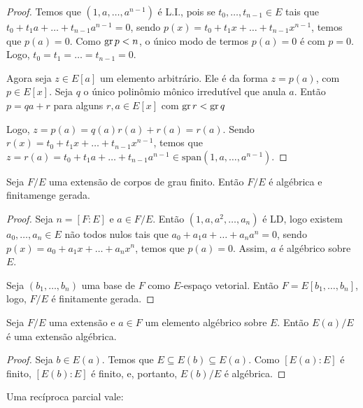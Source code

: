 \begin{proof}
    Temos que $(1, a, \dots, a^{n-1})$ é L.I., pois se $t_0, \dots, t_{n-1} \in E$ tais que $t_0+t_1a+\dots+t_{n-1}a^{n-1}=0$, sendo $p(x)=t_0+t_1x+\dots+t_{n-1}x^{n-1}$, temos que $p(a)=0$. Como $\operatorname{gr} p<n$, o único modo de termos $p(a)=0$ é com $p=0$. Logo, $t_0=t_1=\dots=t_{n-1}=0$.

    Agora seja $z \in E[a]$ um elemento arbitrário. Ele é da forma $z=p(a)$, com $p \in E[x]$. Seja $q$ o único polinômio mônico irredutível que anula $a$. Então $p=qa+r$ para alguns $r, a \in E[x]$ com $\operatorname{gr} r<\operatorname{gr} q$
    
    Logo, $z=p(a)=q(a)r(a)+r(a)=r(a)$. Sendo $r(x)=t_0+t_1x+\dots+t_{n-1}x^{n-1}$, temos que $z=r(a)=t_0+t_1a+\dots+t_{n-1}a^{n-1} \in \text{span}(1, a, \dots, a^{n-1})$.

\end{proof}

\begin{prop}
    Seja $F/E$ uma extensão de corpos de grau finito. Então $F/E$ é algébrica e finitamenge gerada.
\end{prop}
\begin{proof}
    Seja $n=[F:E]$ e $a \in F/E$. Então $(1, a, a^2, \dots, a_{n})$ é LD, logo existem $a_0, \dots, a_n \in E$ não todos nulos tais que $a_0+a_1a+\dots+a_na^n=0$, sendo $p(x)=a_0+a_1x+\dots+a_nx^n$, temos que $p(a)=0$.
    Assim, $a$ é algébrico sobre $E$.

    Seja $(b_1, \dots, b_n)$ uma base de $F$ como $E$-espaço vetorial. Então $F=E[b_1, \dots, b_n]$, logo, $F/E$ é finitamente gerada.
\end{proof}


\begin{corol}
    Seja $F/E$ uma extensão e $a \in F$ um elemento algébrico sobre $E$. Então $E(a)/E$ é uma extensão algébrica.
\end{corol}
\begin{proof}
    Seja $b \in E(a)$. Temos que $E\subseteq E(b)\subseteq E(a)$. Como $[E(a):E]$ é finito, $[E(b):E]$ é finito, e, portanto, $E(b)/E$ é algébrica.
\end{proof}

Uma recíproca parcial vale:

